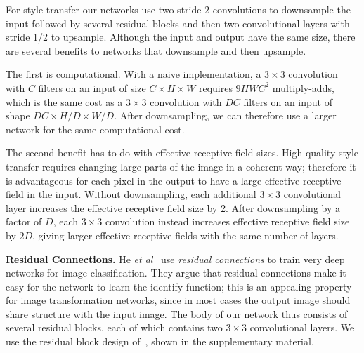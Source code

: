 \documentclass[runningheads]{llncs}
\newcommand{\etal}{\textit{et al}}
\begin{document}
For style transfer our networks use two stride-2 convolutions to downsample the input
followed by several residual blocks and then two convolutional layers with stride 1/2
to upsample. Although the input and output have the same size, there are several benefits to
networks that downsample and then upsample.

The first is computational. With a naive implementation, a $3\times3$ convolution with $C$ filters on
an input of size $C\times H\times W$ requires $9HWC^2$ multiply-adds, which is the same cost
as a $3\times3$ convolution with $DC$ filters on an input of shape $DC\times H/D\times W/D$.
After downsampling, we can therefore use a larger network for the same computational cost.

The second benefit has to do with effective receptive field sizes. High-quality style
transfer requires changing large parts of the image in a coherent way; therefore it is
advantageous for each pixel in the output to have a large effective receptive field in
the input. Without downsampling, each additional $3\times3$ convolutional layer
increases the effective receptive field size by 2. After downsampling by a factor of
$D$, each $3\times3$ convolution instead increases effective receptive field size by $2D$,
giving larger effective receptive fields with the same number of layers.

\vspace{1mm}
\noindent \textbf{Residual Connections.}
He \etal~\cite{he2015deep} use \emph{residual connections} to train very deep
networks for image classification. They argue that residual connections make it easy for the
network to learn the identify function; this is an appealing property for image transformation
networks, since in most cases the output image should share structure with the input image.
The body of our network thus consists of several residual blocks, each of which contains
two $3\times3$ convolutional layers. We use the residual block design
of~\cite{gross2016training}, shown in the supplementary material.

\end{document}
